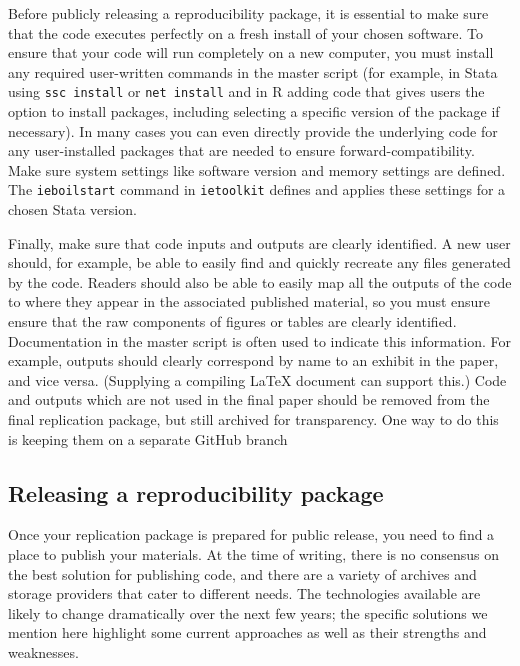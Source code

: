 Before publicly releasing a reproducibility package,
it is essential to make sure that the code executes perfectly on a fresh install of your chosen software.
To ensure that your code will run completely on a new computer,
you must install any required user-written commands in the master script
(for example, in Stata using \texttt{ssc install} or \texttt{net install}
and in R adding code that gives users the option to install packages,
including selecting a specific version of the package if necessary).
In many cases you can even directly provide the underlying code
for any user-installed packages that are needed to ensure forward-compatibility.
Make sure system settings like software version and memory settings are defined.
The \texttt{ieboilstart} command in \texttt{ietoolkit} defines and applies these settings
for a chosen Stata version.

Finally, make sure that code inputs and outputs are clearly identified.
A new user should, for example, be able to easily find and quickly recreate
any files generated by the code.
Readers should also be able to easily map all the outputs of the code
to where they appear in the associated published material,
so you must ensure ensure that the raw components of figures or tables are clearly identified.
Documentation in the master script is often used to indicate this information.
For example, outputs should clearly correspond by name to an exhibit in the paper, and vice versa.
(Supplying a compiling {\LaTeX} document can support this.)
Code and outputs which are not used in the final paper should be removed from the final replication package,
but still archived for transparency.
One way to do this is keeping them on a separate GitHub branch

\subsection{Releasing a reproducibility package}

Once your replication package is prepared for public release,
you need to find a place to publish your materials.
At the time of writing, there is no consensus on the best solution for publishing code,
and there are a variety of archives and storage providers
that cater to different needs.
The technologies available are likely to change dramatically
over the next few years;
the specific solutions we mention here highlight some current approaches
as well as their strengths and weaknesses.

